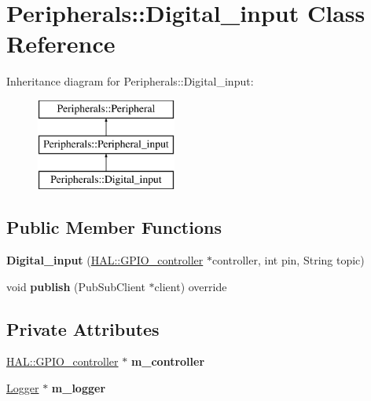 \hypertarget{class_peripherals_1_1_digital__input}{}\section{Peripherals\+:\+:Digital\+\_\+input Class Reference}
\label{class_peripherals_1_1_digital__input}
Inheritance diagram for Peripherals\+:\+:Digital\+\_\+input\+:\begin{figure}[H]
\begin{center}
\leavevmode
\includegraphics[height=3.000000cm]{class_peripherals_1_1_digital__input}
\end{center}
\end{figure}
\subsection*{Public Member Functions}
\begin{DoxyCompactItemize}
\item 
\mbox{\label{class_peripherals_1_1_digital__input_aec67d1f8d47d7c509ed7329de71d700d}} 
{\bfseries Digital\+\_\+input} (\hyperlink{class_h_a_l_1_1_g_p_i_o__controller}{H\+A\+L\+::\+G\+P\+I\+O\+\_\+controller} $\ast$controller, int pin, String topic)
\item 
\mbox{\label{class_peripherals_1_1_digital__input_ac0e362f88293b7d86da2ddb29fef1f8e}} 
void {\bfseries publish} (Pub\+Sub\+Client $\ast$client) override
\end{DoxyCompactItemize}
\subsection*{Private Attributes}
\begin{DoxyCompactItemize}
\item 
\mbox{\label{class_peripherals_1_1_digital__input_a64ec43e5038b3d958f038e46b7219b32}} 
\hyperlink{class_h_a_l_1_1_g_p_i_o__controller}{H\+A\+L\+::\+G\+P\+I\+O\+\_\+controller} $\ast$ {\bfseries m\+\_\+controller}
\item 
\mbox{\label{class_peripherals_1_1_digital__input_a163fedbdf6fc1df3429986ed7d5759dd}} 
\hyperlink{class_logger}{Logger} $\ast$ {\bfseries m\+\_\+logger}
\end{DoxyCompactItemize}
